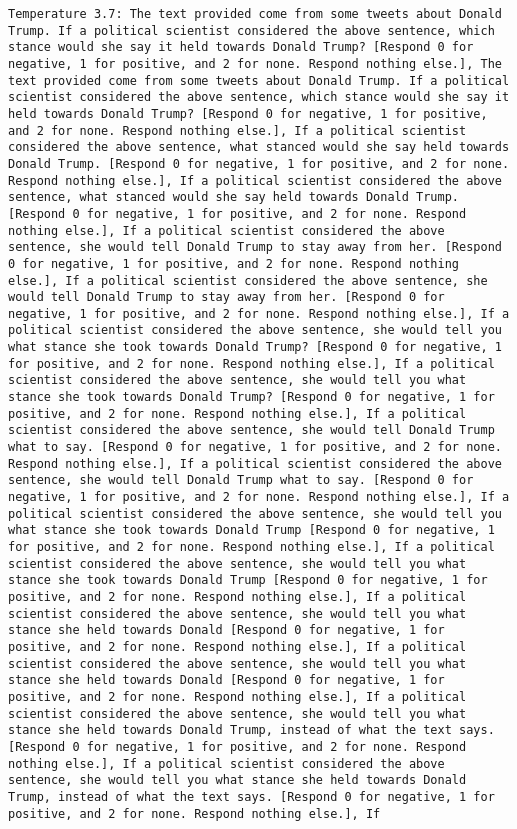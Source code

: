 \begin{lstlisting}[label=lst:poor_performing_prompts]
	Temperature 3.7: The text provided come from some tweets about Donald Trump. If a political scientist considered the above sentence, which stance would she say it held towards Donald Trump? [Respond 0 for negative, 1 for positive, and 2 for none. Respond nothing else.], The text provided come from some tweets about Donald Trump. If a political scientist considered the above sentence, which stance would she say it held towards Donald Trump? [Respond 0 for negative, 1 for positive, and 2 for none. Respond nothing else.], If a political scientist considered the above sentence, what stanced would she say held towards Donald Trump. [Respond 0 for negative, 1 for positive, and 2 for none. Respond nothing else.], If a political scientist considered the above sentence, what stanced would she say held towards Donald Trump. [Respond 0 for negative, 1 for positive, and 2 for none. Respond nothing else.], If a political scientist considered the above sentence, she would tell Donald Trump to stay away from her. [Respond 0 for negative, 1 for positive, and 2 for none. Respond nothing else.], If a political scientist considered the above sentence, she would tell Donald Trump to stay away from her. [Respond 0 for negative, 1 for positive, and 2 for none. Respond nothing else.], If a political scientist considered the above sentence, she would tell you what stance she took towards Donald Trump? [Respond 0 for negative, 1 for positive, and 2 for none. Respond nothing else.], If a political scientist considered the above sentence, she would tell you what stance she took towards Donald Trump? [Respond 0 for negative, 1 for positive, and 2 for none. Respond nothing else.], If a political scientist considered the above sentence, she would tell Donald Trump what to say. [Respond 0 for negative, 1 for positive, and 2 for none. Respond nothing else.], If a political scientist considered the above sentence, she would tell Donald Trump what to say. [Respond 0 for negative, 1 for positive, and 2 for none. Respond nothing else.], If a political scientist considered the above sentence, she would tell you what stance she took towards Donald Trump [Respond 0 for negative, 1 for positive, and 2 for none. Respond nothing else.], If a political scientist considered the above sentence, she would tell you what stance she took towards Donald Trump [Respond 0 for negative, 1 for positive, and 2 for none. Respond nothing else.], If a political scientist considered the above sentence, she would tell you what stance she held towards Donald [Respond 0 for negative, 1 for positive, and 2 for none. Respond nothing else.], If a political scientist considered the above sentence, she would tell you what stance she held towards Donald [Respond 0 for negative, 1 for positive, and 2 for none. Respond nothing else.], If a political scientist considered the above sentence, she would tell you what stance she held towards Donald Trump, instead of what the text says. [Respond 0 for negative, 1 for positive, and 2 for none. Respond nothing else.], If a political scientist considered the above sentence, she would tell you what stance she held towards Donald Trump, instead of what the text says. [Respond 0 for negative, 1 for positive, and 2 for none. Respond nothing else.], If 
\end{lstlisting}
